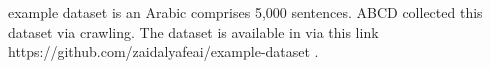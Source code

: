 example dataset is an Arabic comprises 5,000 sentences.
ABCD collected this dataset via crawling. 
The dataset is available in via this link https://github.com/zaidalyafeai/example-dataset .